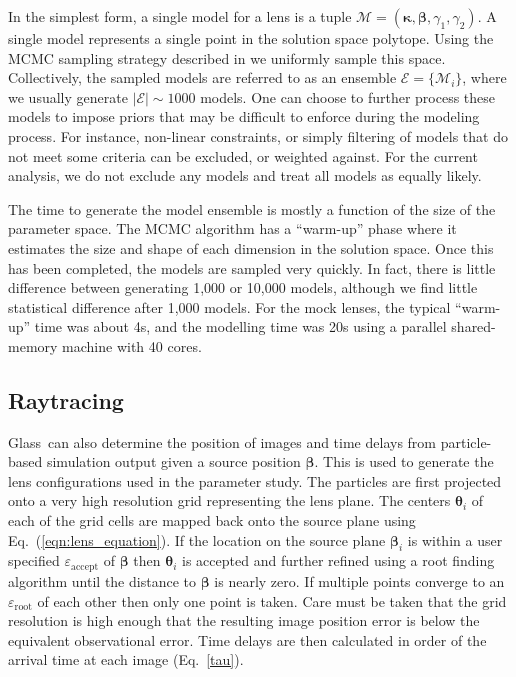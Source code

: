 \documentclass[galley,usenatbib]{mn2e}
\renewcommand{\vec}[1]{\ensuremath{\boldsymbol{#1}}}
\newcommand{\Glass}{{\sc Glass}}
\newcommand{\M}{\ensuremath{\mathscr{M}}}
\newcommand{\E}{\ensuremath{\mathscr{E}}}
\newcommand{\eps}{\ensuremath{\varepsilon}}
\newcommand{\eqnref}[1] {Eq.~(\ref{#1})}
\newcommand{\eqnrefp}[1] {(Eq.~\ref{#1})}
\begin{document}
In the simplest form, a single model for a lens is a tuple $\M = (\vec\kappa,
\vec\beta, \gamma_1, \gamma_2)$. A single model represents a single point in
the solution space polytope. Using the MCMC sampling strategy described in
\cite{2012MNRAS.425.3077L} we uniformly sample this space. Collectively, the
sampled models are referred to as an ensemble $\E = \{\M_i\}$, where we usually
generate $|\E| \sim 1000$ models. One can choose to further process these
models to impose priors that may be difficult to enforce during the
modeling process. For instance, non-linear constraints, or simply filtering
of models that do not meet some criteria can be excluded, or weighted against.
For the current analysis, we do not exclude any models and treat all models
as equally likely.

The time to generate the model ensemble is mostly a function of the size of the
parameter space. The MCMC algorithm has a ``warm-up'' phase where it estimates
the size and shape of each dimension in the solution space.  Once this has been
completed, the models are sampled very quickly. In fact, there is little
difference between generating 1,000 or 10,000 models, although we find little
statistical difference after 1,000 models. For the mock lenses, the typical
``warm-up'' time was about 4s, and the modelling time was 20s using a parallel
shared-memory machine with 40 cores.

\subsection{Raytracing}\label{Raytracing}
\Glass\ can also determine the position of images and time delays from
particle-based simulation output given a source position $\vec\beta$. This is
used to generate the lens configurations used in the parameter study.  The
particles are first projected onto a very high resolution grid representing the
lens plane. The centers $\vec\theta_i$ of each of the grid cells are mapped
back onto the source plane using \eqnref{eqn:lens_equation}. If the location on
the source plane $\vec\beta_i$ is within a user specified
$\eps_\mathrm{accept}$ of $\vec\beta$ then $\vec\theta_i$ is accepted and
further refined using a root finding algorithm until the distance to
$\vec\beta$ is nearly zero. If multiple points converge to an
$\eps_\mathrm{root}$ of each other then only one point is taken.  Care must be
taken that the grid resolution is high enough that the resulting image position
error is below the equivalent observational error. Time delays are then
calculated in order of the arrival time at each image \eqnrefp{tau}.
\end{document}
